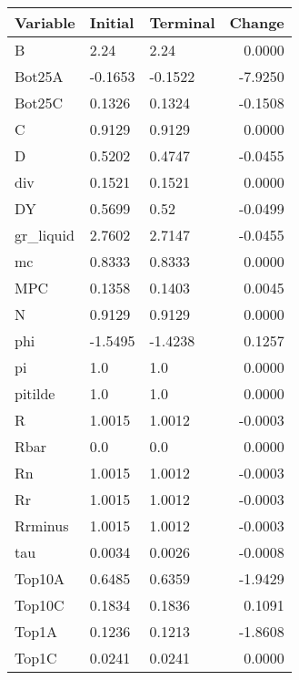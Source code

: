 \begin{table}
\centering
\label{tab:stst_comparison_low_B_limit_permanent}
\begin{tabular}{lllr}
\toprule
                Variable & Initial & Terminal &  Change \\
\midrule
                       B &    2.24 &     2.24 &  0.0000 \\
                  Bot25A & -0.1653 &  -0.1522 & -7.9250 \\
                  Bot25C &  0.1326 &   0.1324 & -0.1508 \\
                       C &  0.9129 &   0.9129 &  0.0000 \\
                       D &  0.5202 &   0.4747 & -0.0455 \\
                     div &  0.1521 &   0.1521 &  0.0000 \\
                      DY &  0.5699 &     0.52 & -0.0499 \\
               gr\_liquid &  2.7602 &   2.7147 & -0.0455 \\
                      mc &  0.8333 &   0.8333 &  0.0000 \\
                     MPC &  0.1358 &   0.1403 &  0.0045 \\
                       N &  0.9129 &   0.9129 &  0.0000 \\
                     phi & -1.5495 &  -1.4238 &  0.1257 \\
                      pi &     1.0 &      1.0 &  0.0000 \\
                 pitilde &     1.0 &      1.0 &  0.0000 \\
                       R &  1.0015 &   1.0012 & -0.0003 \\
                    Rbar &     0.0 &      0.0 &  0.0000 \\
                      Rn &  1.0015 &   1.0012 & -0.0003 \\
                      Rr &  1.0015 &   1.0012 & -0.0003 \\
                 Rrminus &  1.0015 &   1.0012 & -0.0003 \\
                     tau &  0.0034 &   0.0026 & -0.0008 \\
                  Top10A &  0.6485 &   0.6359 & -1.9429 \\
                  Top10C &  0.1834 &   0.1836 &  0.1091 \\
                   Top1A &  0.1236 &   0.1213 & -1.8608 \\
                   Top1C &  0.0241 &   0.0241 &  0.0000 \\

\end{tabular}
\end{table}

